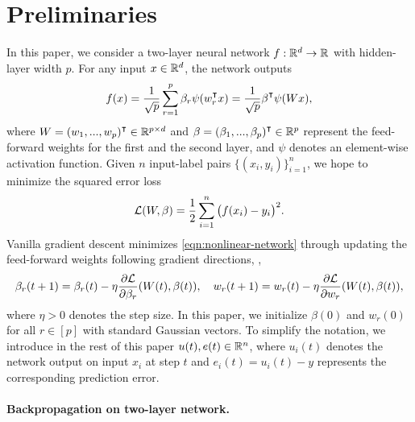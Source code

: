 \section{Preliminaries}

In this paper, we consider a two-layer neural network $f:{\mathbb{R}^{d}} \to \mathbb{R}$ with hidden-layer width $p$. For any input $x\in{\mathbb{R}^{d}}$, the network outputs
\begin{align}\label{eqn:nonlinear-network}
    f(x) = \frac{1}{\sqrt p}\sum_{r=1}^p\beta_r\psi(w_r\transpose x)= \frac{1}{\sqrt p}\beta\transpose\psi(Wx),
\end{align}
where $W = (w_1,...,w_p)\transpose\in\Rpd$ and $\beta = (\beta_1,...,\beta_p)\transpose\in\Rp$ represent the feed-forward weights for the first and the second layer, and $\psi$ denotes an element-wise activation function.
Given $n$ input-label pairs $\{(x_i,y_i)\}_{i=1}^n$, we hope to minimize the squared error loss
\begin{equation}
    \mathcal{L}(W,\beta) = \frac{1}{2}\sum_{i=1}^n \big(f(x_i)-y_i\big)^2.
\end{equation}
Vanilla gradient descent minimizes \eqref{eqn:nonlinear-network} through updating the feed-forward weights following gradient directions, \ie,
\begin{align*}
    \beta_r(t+1) = \beta_r(t)-\eta\frac{\partial\mathcal{L}}{\partial \beta_r}(W(t),\beta(t)), \quad w_r(t+1) = w_r(t)-\eta\frac{\partial\mathcal{L}}{\partial w_r}(W(t),\beta(t)),
\end{align*}
where $\eta>0$ denotes the step size. In this paper, we initialize $\beta(0)$ and $w_r(0)$ for all $r\in[p]$ with standard Gaussian vectors. To simplify the notation, we introduce in the rest of this paper $u(t),e(t)\in \mathbb{R}^n$, where $u_i(t)$ denotes the network output on input $x_i$ at step $t$ and $e_i(t) = u_i(t)-y$ represents the corresponding prediction error.

\paragraph{Backpropagation on two-layer network.}

